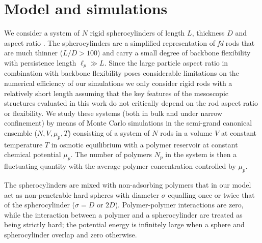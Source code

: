 


\section{Model and simulations}

We consider a system of $N$ rigid spherocylinders of length $L$, thickness $D$ and aspect ratio . The spherocylinders are a simplified representation of {\em fd} rods that are much thinner ($L/D > 100$) and carry a small degree of backbone flexibility with persistence length $\ell_{p} \gg L$. Since the large particle aspect ratio in combination with backbone flexibility poses considerable limitations on the numerical efficiency of our simulations  we  only consider rigid rods with a relatively short length assuming that the key features of the mesoscopic structures evaluated in this work do not  critically depend on the rod aspect ratio or flexibility. We study these systems (both in bulk and under narrow confinement) by means of Monte Carlo simulations in the semi-grand canonical ensemble ($N,V,\mu_{p},T$) consisting of a system of $N$ rods in a volume $V$ at constant temperature $T$ in osmotic equilibrium with a polymer reservoir at constant chemical potential $\mu_{p}$. The number of polymers  $N_{p}$ in the system is then a fluctuating quantity with the average polymer concentration controlled by $\mu_{p}$.


The spherocylinders are mixed with non-adsorbing polymers that in our model act as non-penetrable hard spheres with diameter $\sigma$ equalling once or twice that of the spherocylinder ($\sigma = D$ or $2D$). Polymer-polymer interactions are zero, while the interaction between a polymer and a spherocylinder are treated as being strictly hard;  the potential energy is infinitely large when a sphere and spherocylinder overlap and zero otherwise.



